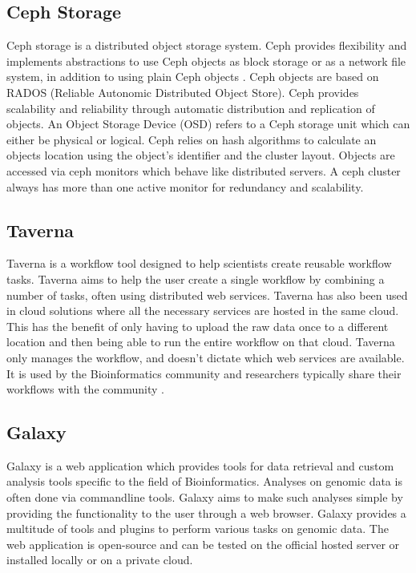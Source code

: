 \documentclass{sig-alternate-05-2015}
\begin{document}
\subsection{Ceph Storage}
Ceph storage is a distributed object storage system. Ceph provides flexibility and implements abstractions to use Ceph objects as block storage or as a network file system, in addition to using plain Ceph objects \cite{wang2013performance}. Ceph objects are based on RADOS (Reliable Autonomic Distributed Object Store). Ceph provides scalability and reliability through automatic distribution and replication of objects. An Object Storage Device (OSD) refers to a Ceph storage unit which can either be physical or logical. Ceph relies on hash algorithms to calculate an objects location using the object's identifier and the cluster layout. Objects are accessed via ceph monitors which behave like distributed servers. A ceph cluster always has more than one active monitor for redundancy and scalability.


\subsection{Taverna}
Taverna is a workflow tool designed to help scientists create reusable workflow tasks. Taverna aims to help the user create a single workflow by combining a number of tasks, often using distributed web services. Taverna has also been used in cloud solutions where all the necessary services are hosted in the same cloud. This has the benefit of only having to upload the raw data once to a different location and then being able to run the entire workflow on that cloud. Taverna only manages the workflow, and doesn't dictate which web services are available. It is used by the Bioinformatics community and researchers typically share their workflows with the community \cite{wolstencroft2013taverna}.

\subsection{Galaxy}
Galaxy is a web application which provides tools for data retrieval and custom analysis tools specific to the field of Bioinformatics. Analyses on genomic data is often done via commandline tools. Galaxy aims to make such analyses simple by providing the functionality to the user through a web browser. Galaxy provides a multitude of tools and plugins to perform various tasks on genomic data.  The web application is open-source and can be tested on the official hosted server or installed locally or on a private cloud\cite{hillman2012using}.
\end{document}

